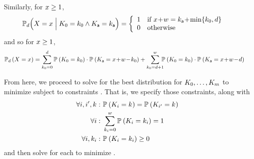 Similarly, for $x \ge 1$, 
\begin{align*}
\cprob{\Big}{\victimDemand}{\evictedNmbrRV=\evictedNmbr}{\linesPerContainerRV{0} = \linesPerContainer{0} \wedge\attackerLineNmbrRV = \attackerLineNmbr}
& = \left\{\begin{array}{ll}
1 & \mbox{if $\evictedNmbr\! +\!\cacheLineNmbr = \attackerLineNmbr\! + \!\min\{\linesPerContainer{0}, \victimDemand\}$} \\
0 & \mbox{otherwise}
\end{array}\right.
\end{align*}
and so for $x \ge 1$,
\begin{align}
\prob{\victimDemand}{\evictedNmbrRV = \evictedNmbr}
& = \sum_{\linesPerContainer{0}=0}^{\victimDemand} \prob{}{\linesPerContainerRV{0} = \linesPerContainer{0}} \cdot \prob{}{\attackerLineNmbrRV = \evictedNmbr\! +\! \cacheLineNmbr \!-\! \linesPerContainer{0}} 
+\sum_{\linesPerContainer{0}=\victimDemand+1}^{\cacheLineNmbr} \hspace{-0.53em}\prob{}{\linesPerContainerRV{0} = \linesPerContainer{0}} \cdot \prob{}{\attackerLineNmbrRV = \evictedNmbr\! +\! \cacheLineNmbr \!-\! \victimDemand}
\label{eqn:moreThanZeroEvictions}
\end{align}

From here, we proceed to solve for the best distribution for
$K_{0}, \ldots, K_{m}$
to minimize  subject to
constraints .
That is, we specify
those constraints, along with
\begin{align}
\forall i, i', k_{}:~ &
\mathbb{P}_{}\left({K_{i} = k_{}}\right) = \mathbb{P}_{}\left({K_{i'} = k_{}}\right) \label{eqn:allDistsSame}\\
\forall i:~ &
\sum_{k_{i} = 0}^{w} \mathbb{P}_{}\left({K_{i} = k_{i}}\right) = 1 \\
\forall i, k_{i}:~ &
\mathbb{P}_{}\left({K_{i} = k_{i}}\right) \ge 0 \label{eqn:nonnegProbs}
\end{align}
and then solve for each \prob{}{\linesPerContainerRV{\containerIdx}
= \linesPerContainer{\containerIdx}} to
minimize .

